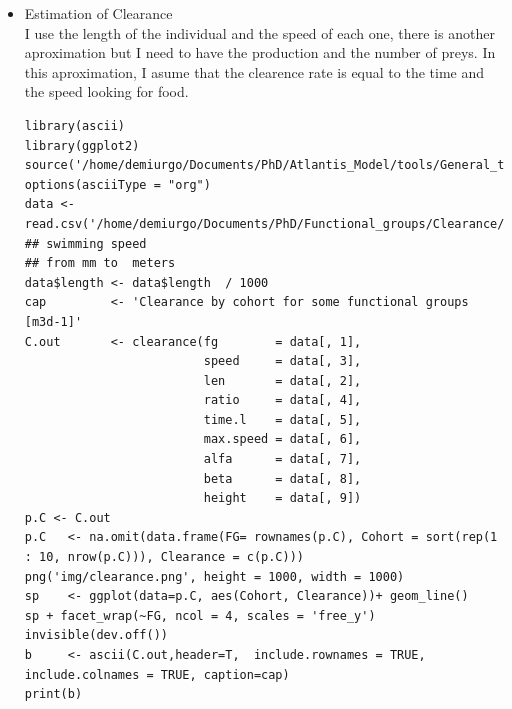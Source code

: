 \documentclass[11pt]{article}
\begin{document}
\begin{itemize}
\item Estimation of Clearance\\
\label{sec-5-2-1-8-3}%
I use the length of the individual and the speed of each one,  there is another aproximation but I need to have the production and the number of preys. In this aproximation,  I asume that the clearence rate is equal to the time and the speed looking for food.

\begin{verbatim}
library(ascii)
library(ggplot2)
source('/home/demiurgo/Documents/PhD/Atlantis_Model/tools/General_tools/Atlantis_tools.R')
options(asciiType = "org")
data <- read.csv('/home/demiurgo/Documents/PhD/Functional_groups/Clearance/c_data.csv')
## swimming speed
## from mm to  meters
data$length <- data$length  / 1000
cap         <- 'Clearance by cohort for some functional groups [m3d-1]'
C.out       <- clearance(fg        = data[, 1],
                         speed     = data[, 3],
                         len       = data[, 2],
                         ratio     = data[, 4],
                         time.l    = data[, 5],
                         max.speed = data[, 6],
                         alfa      = data[, 7],
                         beta      = data[, 8],
                         height    = data[, 9])
p.C <- C.out
p.C   <- na.omit(data.frame(FG= rownames(p.C), Cohort = sort(rep(1 : 10, nrow(p.C))), Clearance = c(p.C)))
png('img/clearance.png', height = 1000, width = 1000)
sp    <- ggplot(data=p.C, aes(Cohort, Clearance))+ geom_line()
sp + facet_wrap(~FG, ncol = 4, scales = 'free_y')
invisible(dev.off())
b     <- ascii(C.out,header=T,  include.rownames = TRUE, include.colnames = TRUE, caption=cap)
print(b)
\end{verbatim}


\end{itemize}
\end{document}
